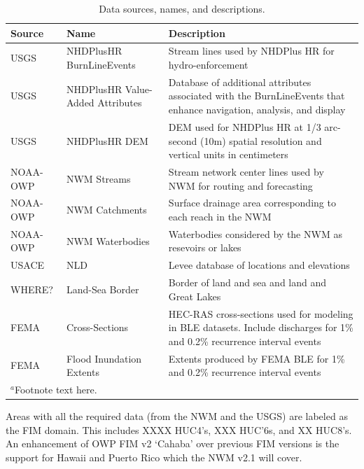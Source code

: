\begin{table}
\caption{Data sources, names, and descriptions.}
\label{tab:data}
\centering
\begin{tabular}{|p{2cm}|p{4cm}|p{8cm}|}
\hline
Source & Name & Description \\
\hline
USGS & NHDPlusHR BurnLineEvents & Stream lines used by NHDPlus HR for hydro-enforcement \\
\hline
USGS & NHDPlusHR Value-Added Attributes & Database of additional attributes associated with the BurnLineEvents that enhance navigation, analysis, and display \\
\hline
USGS & NHDPlusHR DEM & DEM used for NHDPlus HR at 1/3 arc-second (10m) spatial resolution and vertical units in centimeters \\
\hline
NOAA-OWP & NWM Streams & Stream network center lines used by NWM for routing and forecasting \\
\hline
NOAA-OWP & NWM Catchments & Surface drainage area corresponding to each reach in the NWM \\
\hline
NOAA-OWP & NWM Waterbodies & Waterbodies considered by the NWM as resevoirs or lakes \\
\hline
USACE & NLD & Levee database of locations and elevations  \\
\hline
WHERE? & Land-Sea Border & Border of land and sea and land and Great Lakes \\
\hline
FEMA & Cross-Sections & HEC-RAS cross-sections used for modeling in BLE datasets. Include discharges for 1\% and 0.2\% recurrence interval events \\
\hline
FEMA & Flood Inundation Extents & Extents produced by FEMA BLE for 1\% and 0.2\% recurrence interval events \\
\hline
\multicolumn{2}{l}{$^{a}$Footnote text here.}
\end{tabular}
\end{table}

Areas with all the required data (from the NWM and the USGS) are labeled as the FIM domain. 
 This includes XXXX HUC4's, XXX HUC'6s, and XX HUC8's.
An enhancement of OWP FIM v2 `Cahaba' over previous FIM versions is the support for Hawaii and Puerto Rico which the NWM v2.1 will cover.
%
